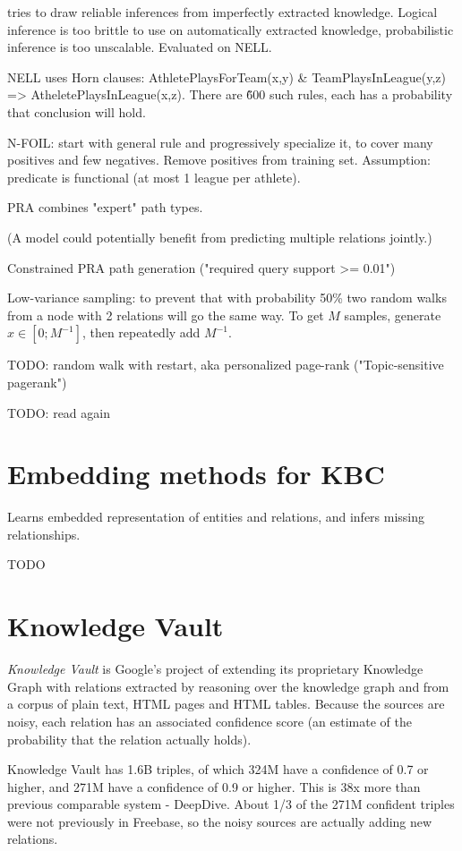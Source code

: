 \cite{random-walk-inference} tries to draw reliable inferences from imperfectly
extracted knowledge. Logical inference is too brittle to use on automatically
extracted knowledge, probabilistic inference is too unscalable.
Evaluated on NELL.

NELL uses Horn clauses: AthletePlaysForTeam(x,y) \& TeamPlaysInLeague(y,z) =>
AtheletePlaysInLeague(x,z). There are \~600 such rules, each has a probability
that conclusion will hold.

N-FOIL: start with general rule and progressively specialize it, to cover many
positives and few negatives. Remove positives from training set.
Assumption: predicate is functional (at most 1 league per athlete).

PRA combines "expert" path types.

(A model could potentially benefit from predicting multiple relations jointly.)

Constrained PRA path generation ("required query support >=
0.01")\cite{random-walk-inference}

Low-variance sampling: to prevent that with probability 50\% two random walks
from a node with 2 relations will go the same way. To get $M$ samples, generate
$x\in[0;M^{-1}]$, then repeatedly add $M^{-1}$.

TODO: random walk with restart, aka personalized page-rank ("Topic-sensitive
pagerank")

TODO: read again

\section{Embedding methods for KBC}

Learns embedded representation of entities and relations, and infers missing
relationships.

TODO

\section{Knowledge Vault}

\textit{Knowledge Vault}\cite{knowledge-vault} is Google's project of extending
its proprietary Knowledge Graph with relations extracted by reasoning over
the knowledge graph and from a corpus of plain text, HTML pages and HTML
tables. Because the sources are noisy, each relation has an associated
confidence score (an estimate of the probability that the relation actually
holds).

Knowledge Vault has 1.6B triples, of which 324M have a confidence of 0.7 or
higher, and 271M have a confidence of 0.9 or higher.
This is 38x more than previous comparable system - DeepDive.
About 1/3 of the 271M confident triples were not previously in Freebase, so
the noisy sources are actually adding new relations.

